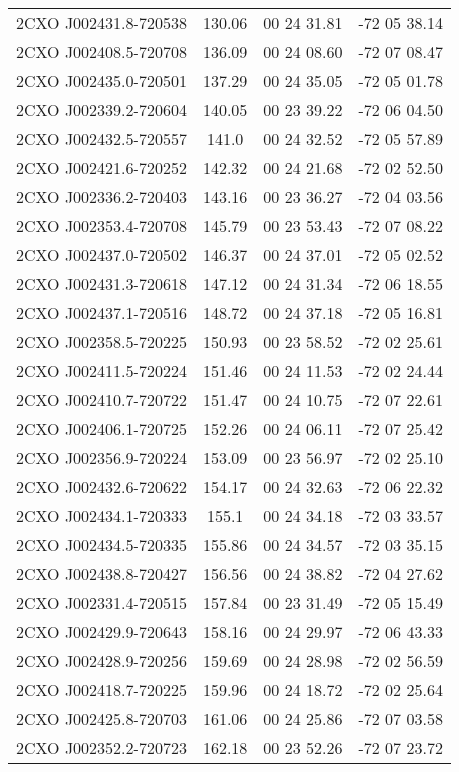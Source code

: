 \begin{table}
\begin{tabular}{cccc}
2CXO J002431.8-720538 & 130.06 & 00 24 31.81 & -72 05 38.14 \\
2CXO J002408.5-720708 & 136.09 & 00 24 08.60 & -72 07 08.47 \\
2CXO J002435.0-720501 & 137.29 & 00 24 35.05 & -72 05 01.78 \\
2CXO J002339.2-720604 & 140.05 & 00 23 39.22 & -72 06 04.50 \\
2CXO J002432.5-720557 & 141.0 & 00 24 32.52 & -72 05 57.89 \\
2CXO J002421.6-720252 & 142.32 & 00 24 21.68 & -72 02 52.50 \\
2CXO J002336.2-720403 & 143.16 & 00 23 36.27 & -72 04 03.56 \\
2CXO J002353.4-720708 & 145.79 & 00 23 53.43 & -72 07 08.22 \\
2CXO J002437.0-720502 & 146.37 & 00 24 37.01 & -72 05 02.52 \\
2CXO J002431.3-720618 & 147.12 & 00 24 31.34 & -72 06 18.55 \\
2CXO J002437.1-720516 & 148.72 & 00 24 37.18 & -72 05 16.81 \\
2CXO J002358.5-720225 & 150.93 & 00 23 58.52 & -72 02 25.61 \\
2CXO J002411.5-720224 & 151.46 & 00 24 11.53 & -72 02 24.44 \\
2CXO J002410.7-720722 & 151.47 & 00 24 10.75 & -72 07 22.61 \\
2CXO J002406.1-720725 & 152.26 & 00 24 06.11 & -72 07 25.42 \\
2CXO J002356.9-720224 & 153.09 & 00 23 56.97 & -72 02 25.10 \\
2CXO J002432.6-720622 & 154.17 & 00 24 32.63 & -72 06 22.32 \\
2CXO J002434.1-720333 & 155.1 & 00 24 34.18 & -72 03 33.57 \\
2CXO J002434.5-720335 & 155.86 & 00 24 34.57 & -72 03 35.15 \\
2CXO J002438.8-720427 & 156.56 & 00 24 38.82 & -72 04 27.62 \\
2CXO J002331.4-720515 & 157.84 & 00 23 31.49 & -72 05 15.49 \\
2CXO J002429.9-720643 & 158.16 & 00 24 29.97 & -72 06 43.33 \\
2CXO J002428.9-720256 & 159.69 & 00 24 28.98 & -72 02 56.59 \\
2CXO J002418.7-720225 & 159.96 & 00 24 18.72 & -72 02 25.64 \\
2CXO J002425.8-720703 & 161.06 & 00 24 25.86 & -72 07 03.58 \\
2CXO J002352.2-720723 & 162.18 & 00 23 52.26 & -72 07 23.72 \\

\end{tabular}
\end{table}
